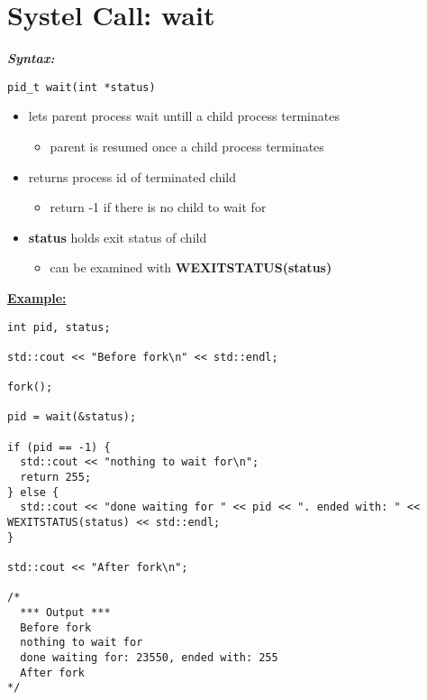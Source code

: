 \documentclass{report}
\begin{document}
\section{Systel Call: wait}
\bigbreak \noindent
\textbf{\textit{Syntax:}}
\begin{verbatim}
pid_t wait(int *status)
\end{verbatim}
\begin{itemize}
  \item lets parent process wait untill a child process terminates
    \begin{itemize}[label=$\circ$]
      \item parent is resumed once a child process terminates
    \end{itemize}
  \item returns process id of terminated child
    \begin{itemize}[label=$\circ$]
      \item return -1 if there is no child to wait for
    \end{itemize}
  \item \textbf{status} holds exit status of child
    \begin{itemize}[label=$\circ$]
      \item can be examined with \textbf{WEXITSTATUS(status)}
    \end{itemize}
\end{itemize}
\bigbreak \noindent
\textbf{\underline{Example:}}
\begin{verbatim}
int pid, status;

std::cout << "Before fork\n" << std::endl;

fork();

pid = wait(&status);

if (pid == -1) {
  std::cout << "nothing to wait for\n";
  return 255;
} else {
  std::cout << "done waiting for " << pid << ". ended with: " << WEXITSTATUS(status) << std::endl;
}

std::cout << "After fork\n";

/*
  *** Output ***
  Before fork
  nothing to wait for
  done waiting for: 23550, ended with: 255
  After fork
*/
\end{verbatim}
\end{document}
